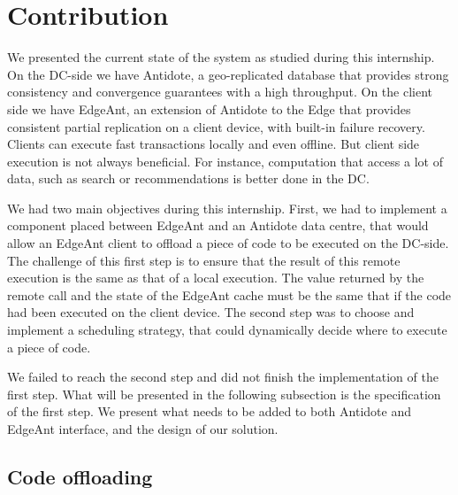 \documentclass[11pt]{article}
\begin{document}
\section{Contribution}

We presented the current state of the system as studied during this
internship. On the DC-side we have Antidote, a geo-replicated database that
provides strong consistency and convergence guarantees with a high throughput.
On the client side we have EdgeAnt, an extension of Antidote to the Edge that
provides consistent partial replication on a client device, with built-in
failure recovery. Clients can execute fast transactions locally and even
offline. But client side execution is not always beneficial. For instance,
computation that access a lot of data, such as search or recommendations is
better done in the DC.

We had two main objectives during this internship. First, we had to implement
a component placed between EdgeAnt and an Antidote data centre, that would
allow an EdgeAnt client to offload a piece of code to be executed on the
DC-side. The challenge of this first step is to ensure that the result of this
remote execution is the same as that of a local execution. The value returned
by the remote call and the state of the EdgeAnt cache must be the same that if
the code had been executed on the client device. The second step was to choose
and implement a scheduling strategy, that could dynamically decide where to
execute a piece of code.

We failed to reach the second step and did not finish the implementation of
the first step. What will be presented in the following subsection is the
specification of the first step. We present what needs to be added to both
Antidote and EdgeAnt interface, and the design of our solution.


\subsection{Code offloading}
\end{document}
